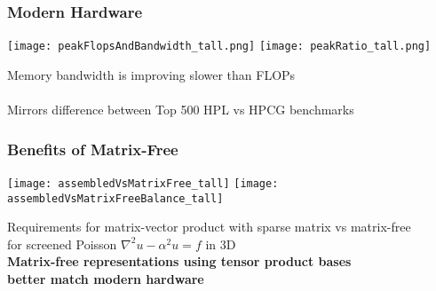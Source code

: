 \documentclass{beamer}
\begin{document}

\begin{frame}
\begin{center}
\frametitle{Modern Hardware}

\texttt{[image: peakFlopsAndBandwidth\_tall.png]}
\hspace{1cm}
\texttt{[image: peakRatio\_tall.png]}

Memory bandwidth is improving slower than FLOPs\\

~\\

Mirrors difference between Top 500 HPL vs HPCG benchmarks\\

\end{center}
\end{frame}


\begin{frame}
\begin{center}
\frametitle{Benefits of Matrix-Free}

\texttt{[image: assembledVsMatrixFree\_tall]}
\hspace{1cm}
\texttt{[image: assembledVsMatrixFreeBalance\_tall]}

{\small Requirements for matrix-vector product with sparse matrix vs matrix-free\\ for screened Poisson $\nabla^2 u - \alpha^2 u = f$ in 3D}\\

{\bf Matrix-free representations using tensor product bases\\better match modern hardware}

\end{center}
\end{frame}

\end{document}
